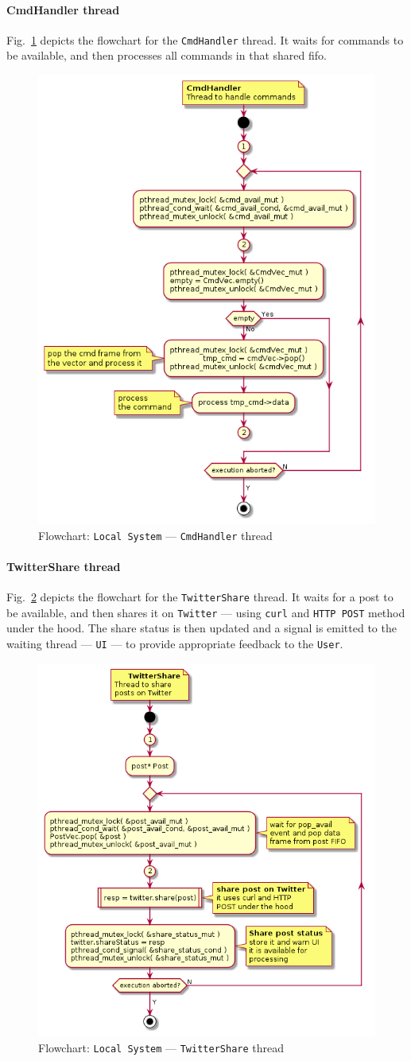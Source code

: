 \paragraph{CmdHandler thread}
Fig.~\ref{fig:flow-local-cmd-handler} depicts the flowchart for the
\texttt{CmdHandler} thread. It waits for commands to be available, and then
processes all commands in that shared \gls{fifo}.
%
\begin{figure}[htb!]
\centering
    \includegraphics[width=0.55\columnwidth]{./img/flow-local-cmd-handler.png}
  \caption{Flowchart: \texttt{Local System} --- \texttt{CmdHandler} thread}%
\label{fig:flow-local-cmd-handler}
\end{figure}
\paragraph{TwitterShare thread}
Fig.~\ref{fig:flow-local-twitter-share} depicts the flowchart for the
\texttt{TwitterShare} thread. It waits for a post to be available, and then
shares it on \texttt{Twitter} --- using \texttt{curl} and \texttt{HTTP POST}
method under the hood. The share status is then updated and a signal is emitted
to the waiting thread --- \texttt{UI} --- to provide appropriate feedback to the
\texttt{User}.
%
\begin{figure}[htb!]
\centering
    \includegraphics[width=0.6\columnwidth]{./img/flow-local-twitter-share.png}
  \caption{Flowchart: \texttt{Local System} --- \texttt{TwitterShare} thread}%
\label{fig:flow-local-twitter-share}
\end{figure}
%
